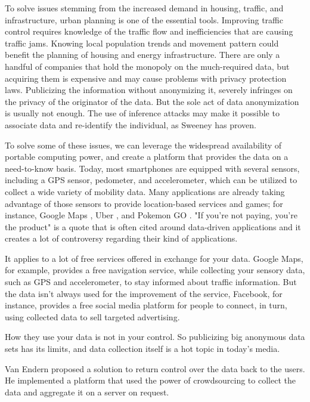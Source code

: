 To solve issues stemming from the increased demand in housing, traffic, and infrastructure, urban planning is one of the essential tools. Improving traffic control requires knowledge of the traffic flow and inefficiencies that are causing traffic jams. Knowing local population trends and movement pattern could benefit the planning of housing and energy infrastructure. There are only a handful of companies that hold the monopoly on the much-required data, but acquiring them is expensive and may cause problems with privacy protection laws. Publicizing the information without anonymizing it, severely infringes on the privacy of the originator of the data. But the sole act of data anonymization is usually not enough. The use of inference attacks may make it possible to associate data and re-identify the individual, as Sweeney \cite{DBLP:journals/ijufks/Sweene02} has proven.

To solve some of these issues, we can leverage the widespread availability of portable computing power, and create a platform that provides the data on a need-to-know basis. Today, most smartphones are equipped with several sensors, including a GPS sensor, pedometer, and accelerometer, which can be utilized to collect a wide variety of mobility data. Many applications are already taking advantage of those sensors to provide location-based services and games; for instance, Google Maps \cite{maps}, Uber \cite{uber}, and Pokemon GO \cite{pokemon}. "If you're not paying, you're the product" is a quote that is often cited around data-driven applications \cite{newyorktimes}\cite{tedtalk}\cite{arstechnica} and it creates a lot of controversy regarding their kind of applications.

It applies to a lot of free services offered in exchange for your data. Google Maps, for example, provides a free navigation service, while collecting your sensory data, such as GPS and accelerometer, to stay informed about traffic information. But the data isn't always used for the improvement of the service, Facebook, for instance, provides a free social media platform for people to connect, in turn, using collected data to sell targeted advertising.

How they use your data is not in your control. So publicizing big anonymous data sets has its limits, and data collection itself is a hot topic in today's media. 

Van Endern \cite{simon} proposed a solution to return control over the data back to the users. He implemented a platform that used the power of crowdsourcing to collect the data and aggregate it on a server on request.

